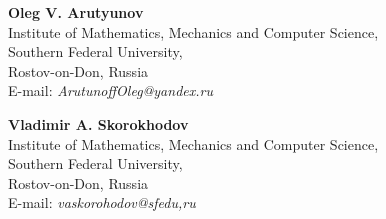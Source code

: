 \documentclass[leqno]{aadmbook}
\begin{document}
\vspace{1cc}

\noindent
{\bf Oleg V. Arutyunov}\\
Institute of Mathematics, Mechanics and Computer Science,\\
Southern Federal University,\\
Rostov-on-Don, Russia\\
E-mail: {\it ArutunoffOleg@yandex.ru}

\vspace{0.1cc}

\noindent
{\bf Vladimir A. Skorokhodov}\\
Institute of Mathematics, Mechanics and Computer Science,\\
Southern Federal University,\\
Rostov-on-Don, Russia\\
E-mail: {\it vaskorohodov@sfedu,ru}
\end{document}
